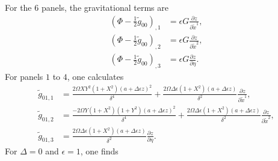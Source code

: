 \documentclass{article}
\begin{document}
For the 6 panels, the gravitational terms are
\begin{align}
\left( \Phi - \frac{1}{2} \tilde{g}_{00}\right)_{,1}&=\epsilon G \frac{\partial z}{\partial \tilde{x}^1}, \\
\left( \Phi - \frac{1}{2} \tilde{g}_{00}\right)_{,2}&=\epsilon G \frac{\partial z}{\partial \tilde{x}^2}, \\
\left( \Phi - \frac{1}{2} \tilde{g}_{00}\right)_{,3}&=\epsilon G \frac{\partial z}{\partial \eta}.
\end{align}
For panels $1$ to $4$, one calculates
\begin{align}
\tilde{g}_{01,1}&=\frac{2\Omega XY^2(1+X^2)(a+\Delta \epsilon z)^2}{\delta^4} + \frac{2\Omega \Delta \epsilon (1+X^2)(a+\Delta \epsilon z)}{\delta^2} \frac{\partial z}{\partial \tilde{x}^1}, \\
\tilde{g}_{01,2}&=\frac{-2\Omega Y(1+X^2)(1+Y^2)(a+\Delta \epsilon z)^2}{\delta^4} + \frac{2\Omega \Delta \epsilon (1+X^2)(a+\Delta \epsilon z)}{\delta^2} \frac{\partial z}{\partial \tilde{x}^2}, \\
\tilde{g}_{01,3}&=\frac{2\Omega \Delta \epsilon (1+X^2)(a+\Delta \epsilon z)}{\delta^2} \frac{\partial z}{\partial \eta}.
\end{align}
For $\Delta=0$ and $\epsilon=1$, one finds
\end{document}

